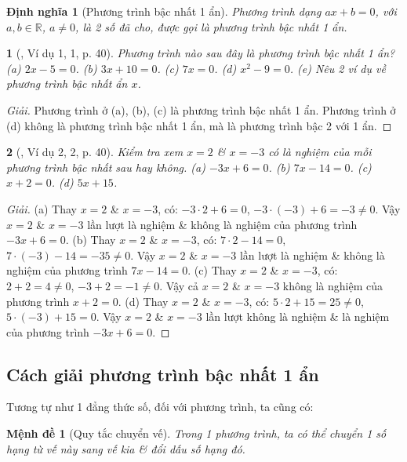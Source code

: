\documentclass{article}
\newtheorem{baitoan}{}
\newtheorem{dinhnghia}{Định nghĩa}
\newtheorem{menhde}{Mệnh đề}
\begin{document}
\begin{dinhnghia}[Phương trình bậc nhất 1 ẩn]
	Phương trình dạng $ax + b = 0$, với $a,b\in\mathbb{R}$, $a\ne0$, là 2 số đã cho, được gọi là \emph{phương trình bậc nhất 1 ẩn}.
\end{dinhnghia}

\begin{baitoan}[\cite{SGK_Toan_8_Canh_Dieu_tap_2}, Ví dụ 1, 1, p. 40]
	Phương trình nào sau đây là phương trình bậc nhất 1 ẩn? (a) $2x - 5 = 0$. (b) $3x + 10 = 0$. (c) $7x = 0$. (d) $x^2 - 9 = 0$. (e) Nêu 2 ví dụ về phương trình bậc nhất ẩn $x$.
\end{baitoan}

\begin{proof}[Giải]
	Phương trình ở (a), (b), (c) là phương trình bậc nhất 1 ẩn. Phương trình ở (d) không là phương trình bậc nhất 1 ẩn, mà là phương trình bậc 2 với 1 ẩn.
\end{proof}

\begin{baitoan}[\cite{SGK_Toan_8_Canh_Dieu_tap_2}, Ví dụ 2, 2, p. 40]
	Kiểm tra xem $x = 2$ \& $x = -3$ có là nghiệm của mỗi phương trình bậc nhất sau hay không. (a) $-3x + 6 = 0$. (b) $7x - 14 = 0$. (c) $x + 2 = 0$. (d) $5x + 15$.
\end{baitoan}

\begin{proof}[Giải]
	(a) Thay $x = 2$ \& $x = -3$, có: $-3\cdot2 + 6 = 0$, $-3\cdot(-3) + 6 = -3\ne0$. Vậy $x = 2$ \& $x = -3$ lần lượt là nghiệm \& không là nghiệm của phương trình $-3x + 6 = 0$. (b) Thay $x = 2$ \& $x = -3$, có: $7\cdot2 - 14 = 0$, $7\cdot(-3) - 14 = -35\ne0$. Vậy $x = 2$ \& $x = -3$ lần lượt là nghiệm \& không là nghiệm của phương trình $7x - 14 = 0$. (c) Thay $x = 2$ \& $x = -3$, có: $2 + 2 = 4\ne0$, $-3 + 2 = -1\ne0$. Vậy cả $x = 2$ \& $x = -3$ không là nghiệm của phương trình $x + 2 = 0$. (d) Thay $x = 2$ \& $x = -3$, có: $5\cdot2 + 15 = 25\ne0$, $5\cdot(-3) + 15 = 0$. Vậy $x = 2$ \& $x = -3$ lần lượt không là nghiệm \& là nghiệm của phương trình $-3x + 6 = 0$.
\end{proof}

\subsection{Cách giải phương trình bậc nhất 1 ẩn}
Tương tự như 1 đẳng thức số, đối với phương trình, ta cũng có:

\begin{menhde}[Quy tắc chuyển vế]
	Trong 1 phương trình, ta có thể chuyển 1 số hạng từ vế này sang vế kia \& đổi dấu số hạng đó.
\end{menhde}
\end{document}
